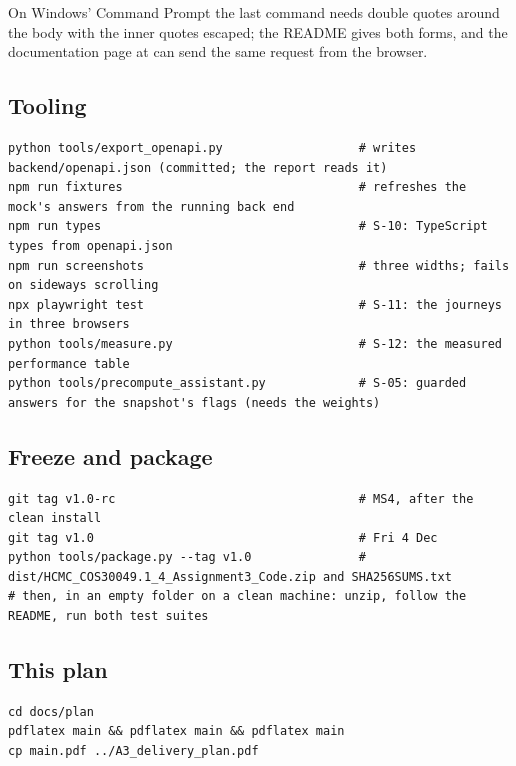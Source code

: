 On Windows' Command Prompt the last command needs double quotes around the body with the inner
quotes escaped; the README gives both forms, and the documentation page at  can send
the same request from the browser.

\subsection{Tooling}

\begin{lstlisting}
python tools/export_openapi.py                   # writes backend/openapi.json (committed; the report reads it)
npm run fixtures                                 # refreshes the mock's answers from the running back end
npm run types                                    # S-10: TypeScript types from openapi.json
npm run screenshots                              # three widths; fails on sideways scrolling
npx playwright test                              # S-11: the journeys in three browsers
python tools/measure.py                          # S-12: the measured performance table
python tools/precompute_assistant.py             # S-05: guarded answers for the snapshot's flags (needs the weights)
\end{lstlisting}

\subsection{Freeze and package}

\begin{lstlisting}
git tag v1.0-rc                                  # MS4, after the clean install
git tag v1.0                                     # Fri 4 Dec
python tools/package.py --tag v1.0               # dist/HCMC_COS30049.1_4_Assignment3_Code.zip and SHA256SUMS.txt
# then, in an empty folder on a clean machine: unzip, follow the README, run both test suites
\end{lstlisting}

\subsection{This plan}

\begin{lstlisting}
cd docs/plan
pdflatex main && pdflatex main && pdflatex main
cp main.pdf ../A3_delivery_plan.pdf
\end{lstlisting}
